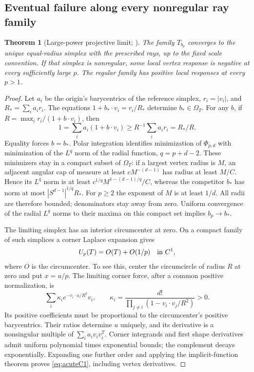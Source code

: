 \documentclass[11pt]{article}
\newtheorem{theorem}{Theorem}[section]
\theoremstyle{definition}
\begin{document}
\subsection{Eventual failure along every nonregular ray family}
\begin{theorem}[Large-power projective limit; \cite{Projective}]
The family $T_{b_p}$ converges to the unique equal-radius simplex with
the prescribed rays, up to the fixed scale convention. If that simplex
is nonregular, some local vertex response is negative at every
sufficiently large $p$. The regular family has positive local responses
at every $p>1$.
\end{theorem}
\begin{proof}
Let $a_i$ be the origin's barycentrics of the reference simplex,
$r_i=|v_i|$, and $R_* =\sum_i a_i r_i$. The equations
$1+b_*\cdot v_i=r_i/R_*$ determine $b_*\in\Omega_T$.
For any $b$, if $R=\max_i r_i/(1+b\cdot v_i)$, then
\[
 1=\sum_i a_i(1+b\cdot v_i)\ge R^{-1}\sum_i a_i r_i=R_*/R.
\]
Equality forces $b=b_*$. Polar integration identifies minimization of
$\Phi_{p,d}$ with minimization of the $L^q$ norm of the radial function,
$q=p+d-2$. These minimizers stay in a compact subset of $\Omega_T$:
if a largest vertex radius is $M$, an adjacent angular cap of measure
at least $cM^{-(d-1)}$ has radius at least $M/C$. Hence its $L^q$ norm
is at least $c^{1/q}M^{1-(d-1)/q}/C$, whereas the competitor $b_*$ has
norm at most $|S^{d-1}|^{1/q}R_*$. For $p\ge2$ the exponent of $M$
is at least $1/d$. All radii are therefore bounded; denominators stay
away from zero. Uniform convergence of the radial $L^q$ norms to their
maxima on this compact set implies $b_p\to b_*$.

The limiting simplex has an interior circumcenter at zero. On a compact
family of such simplices a corner Laplace expansion gives
\begin{equation}\label{eq:acuteC1}
 U_p(T)=O(T)+O(1/p)\quad\hbox{in }C^1,
\end{equation}
where $O$ is the circumcenter. To see this, center the circumcircle of
radius $R$ at zero and put $x=u/p$. The limiting corner force, after a
common positive normalization, is
\[
 \sum_i\kappa_i e^{-v_i\cdot u/R^2}v_i,\qquad
 \kappa_i=\frac{d!}{\prod_{j\ne i}(1-v_i\cdot v_j/R^2)}>0.
\]
Its positive coefficients must be proportional to the circumcenter's
positive barycentrics. Their ratios determine $u$ uniquely, and its
derivative is a nonsingular multiple of $\sum_i a_iv_iv_i^T$.
Corner integrands and first shape derivatives admit uniform polynomial
times exponential bounds; the complement decays exponentially. Expanding
one further order and applying the implicit-function theorem proves
\eqref{eq:acuteC1}, including vertex derivatives.


\end{proof}
\end{document}
